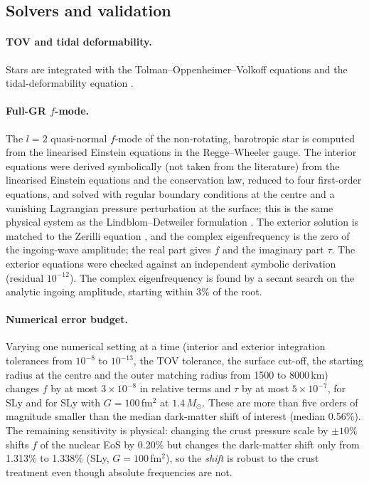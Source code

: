 \documentclass[11pt,a4paper]{article}
\newcommand{\Msun}{M_\odot}
\begin{document}
\subsection{Solvers and validation}\label{sec:solver}
\paragraph{TOV and tidal deformability.} Stars are integrated with the Tolman--Oppenheimer--Volkoff equations \citep{Tolman39,OV39} and the tidal-deformability equation \citep{Hinderer08}.
\paragraph{Full-GR $f$-mode.} The $l=2$ quasi-normal $f$-mode of the non-rotating, barotropic star is computed from the linearised Einstein equations in the Regge--Wheeler gauge. The interior equations were derived symbolically (not taken from the literature) from the linearised Einstein equations and the conservation law, reduced to four first-order equations, and solved with regular boundary conditions at the centre and a vanishing Lagrangian pressure perturbation at the surface; this is the same physical system as the Lindblom--Detweiler formulation \citep{DL85}. The exterior solution is matched to the Zerilli equation \citep{Zerilli70}, and the complex eigenfrequency is the zero of the ingoing-wave amplitude; the real part gives $f$ and the imaginary part $\tau$. The exterior equations were checked against an independent symbolic derivation (residual $10^{-12}$). The complex eigenfrequency is found by a secant search on the analytic ingoing amplitude, starting within 3\% of the root.
\paragraph{Numerical error budget.} Varying one numerical setting at a time (interior and exterior integration tolerances from $10^{-8}$ to $10^{-13}$, the TOV tolerance, the surface cut-off, the starting radius at the centre and the outer matching radius from 1500 to 8000\,km) changes $f$ by at most $3\times10^{-8}$ in relative terms and $\tau$ by at most $5\times10^{-7}$, for SLy and for SLy with $G=100$\,fm$^2$ at $1.4\,\Msun$. These are more than five orders of magnitude smaller than the median dark-matter shift of interest (median 0.56\%). The remaining sensitivity is physical: changing the crust pressure scale by $\pm10\%$ shifts $f$ of the nuclear EoS by 0.20\% but changes the dark-matter shift only from 1.313\% to 1.338\% (SLy, $G=100$\,fm$^2$), so the \emph{shift} is robust to the crust treatment even though absolute frequencies are not.
\end{document}
